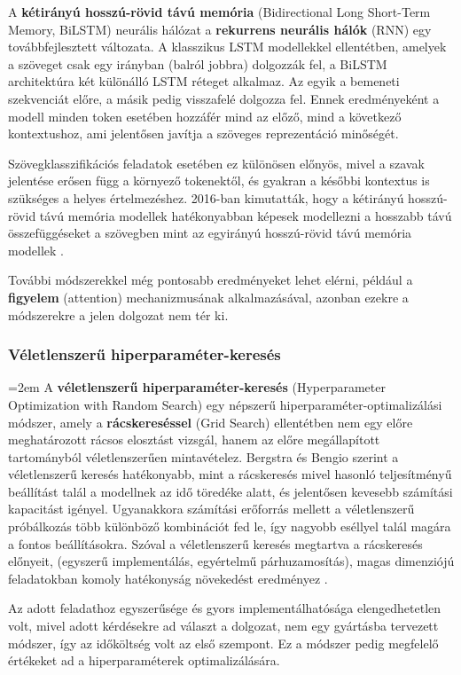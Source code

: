 A \textbf{kétirányú hosszú-rövid távú memória} (Bidirectional Long Short-Term Memory, BiLSTM) neurális hálózat a \textbf{rekurrens neurális hálók} (RNN) 
egy továbbfejlesztett változata. A klasszikus LSTM modellekkel ellentétben, amelyek a szöveget csak egy irányban (balról jobbra) dolgozzák fel, 
a BiLSTM architektúra két különálló LSTM réteget alkalmaz. Az egyik a bemeneti szekvenciát előre, a másik pedig visszafelé dolgozza fel. 
Ennek eredményeként a modell minden token esetében hozzáfér mind az előző, mind a következő kontextushoz, 
ami jelentősen javítja a szöveges reprezentáció minőségét\cite{zhou2016textclassificationimprovedintegrating}.

Szövegklasszifikációs feladatok esetében ez különösen előnyös, mivel a szavak jelentése erősen függ a környező tokenektől, 
és gyakran a későbbi kontextus is szükséges a helyes értelmezéshez. 2016-ban kimutatták, hogy a kétirányú hosszú-rövid távú memória 
modellek hatékonyabban képesek modellezni a hosszabb távú összefüggéseket a szövegben mint az egyirányú hosszú-rövid távú memória modellek \cite{LIU2019325}.

További módszerekkel még pontosabb eredményeket lehet elérni, például a \textbf{figyelem} (attention) mechanizmusának alkalmazásával,
 azonban ezekre a módszerekre a jelen dolgozat nem tér ki. 

\subsubsection{Véletlenszerű hiperparaméter-keresés}

{\emergencystretch=2em\relax
A \textbf{véletlenszerű hiperparaméter-keresés}
(Hyper\-parameter Optimization with Random Search) egy népszerű hiperparaméter-optimalizálási módszer,
amely a \textbf{rácskereséssel} (Grid Search) ellentétben nem egy előre meghatározott rácsos elosztást vizsgál, 
hanem az előre megállapított tartományból véletlenszerűen mintavételez. Bergstra és Bengio szerint a véletlenszerű keresés hatékonyabb, mint a rácskeresés 
mivel hasonló teljesítményű beállítást talál a modellnek az idő töredéke alatt, és jelentősen kevesebb számítási kapacitást igényel. 
Ugyanakkora számítási erőforrás mellett a véletlenszerű próbálkozás több különböző kombinációt fed le, így nagyobb eséllyel talál magára a fontos beállításokra. 
Szóval a véletlenszerű keresés megtartva a rácskeresés előnyeit, (egyszerű implementálás, egyértelmű párhuzamosítás), 
magas dimenziójú feladatokban komoly hatékonyság növekedést eredményez \cite{randomsearch}.

Az adott feladathoz egyszerűsége és gyors implementálhatósága elengedhetetlen volt, mivel adott kérdésekre ad választ a dolgozat, nem egy gyártásba tervezett módszer, 
így az időköltség volt az első szempont. Ez a módszer pedig megfelelő értékeket ad a hiperparaméterek optimalizálására.
}


